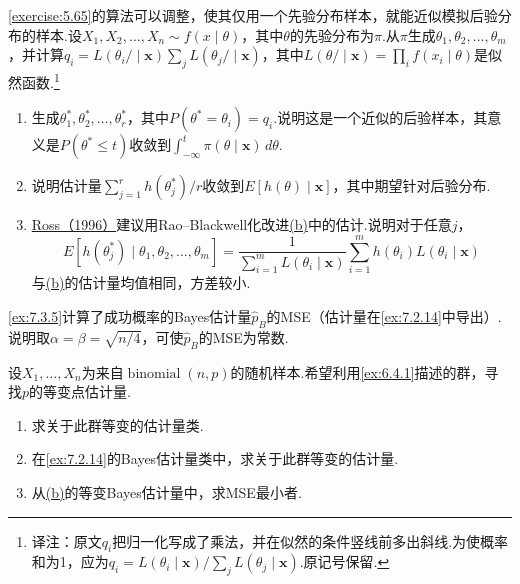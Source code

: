 \begin{exercise}\label{exercise:7.32}
\autoref{exercise:5.65}的算法可以调整，使其仅用一个先验分布样本，就能近似模拟后验分布的样本.设$X_1,X_2,\ldots,X_n\sim f(x\mid\theta)$，其中$\theta$的先验分布为$\pi$.从$\pi$生成$\theta_1,\theta_2,\ldots,\theta_m$，并计算$ q_i=L(\theta_i/\mid\boldsymbol x)\sum_jL(\theta_j/\mid\boldsymbol x)$，其中$L(\theta/\mid\boldsymbol x)=\prod_i f(x_i\mid\theta)$是似然函数.\footnote{译注：原文$q_i$把归一化写成了乘法，并在似然的条件竖线前多出斜线.为使概率和为1，应为$q_i=L(\theta_i\mid\boldsymbol x)/\sum_jL(\theta_j\mid\boldsymbol x)$.原记号保留.}
\begin{enumerate}[label=(\alph*)]
\item 生成$\theta_1^*,\theta_2^*,\ldots,\theta_r^*$，其中$P(\theta^*=\theta_i)=q_i$.说明这是一个近似的后验样本，其意义是$P(\theta^*\le t)$收敛到$\int_{-\infty}^t\pi(\theta\mid\boldsymbol x)\,d\theta$.
\item{}\label{itm:exercise:7.32:b} 说明估计量$\sum_{j=1}^rh(\theta_j^*)/r$收敛到$E[h(\theta)\mid\boldsymbol x]$，其中期望针对后验分布.
\item \hyperref[bib:source261]{Ross（1996）}建议用Rao--Blackwell化改进\hyperref[itm:exercise:7.32:b]{(b)}中的估计.说明对于任意$j$，
$$E[h(\theta_j^*)\mid\theta_1,\theta_2,\ldots,\theta_m]=\frac1{\sum_{i=1}^mL(\theta_i\mid\boldsymbol x)}\sum_{i=1}^mh(\theta_i)L(\theta_i\mid\boldsymbol x)$$
与\hyperref[itm:exercise:7.32:b]{(b)}的估计量均值相同，方差较小.
\end{enumerate}
\end{exercise}
\begin{exercise}\label{exercise:7.33}
\autoref{ex:7.3.5}计算了成功概率的Bayes估计量$\widehat p_B$的MSE（估计量在\autoref{ex:7.2.14}中导出）.说明取$\alpha=\beta=\sqrt{n/4}$，可使$\widehat p_B$的MSE为常数.
\end{exercise}
\begin{exercise}\label{exercise:7.34}
设$X_1,\ldots,X_n$为来自$\operatorname{binomial}(n,p)$的随机样本.希望利用\autoref{ex:6.4.1}描述的群，寻找$p$的等变点估计量.
\begin{enumerate}[label=(\alph*)]
\item 求关于此群等变的估计量类.
\item{}\label{itm:exercise:7.34:b} 在\autoref{ex:7.2.14}的Bayes估计量类中，求关于此群等变的估计量.
\item 从\hyperref[itm:exercise:7.34:b]{(b)}的等变Bayes估计量中，求MSE最小者.
\end{enumerate}
\end{exercise}
